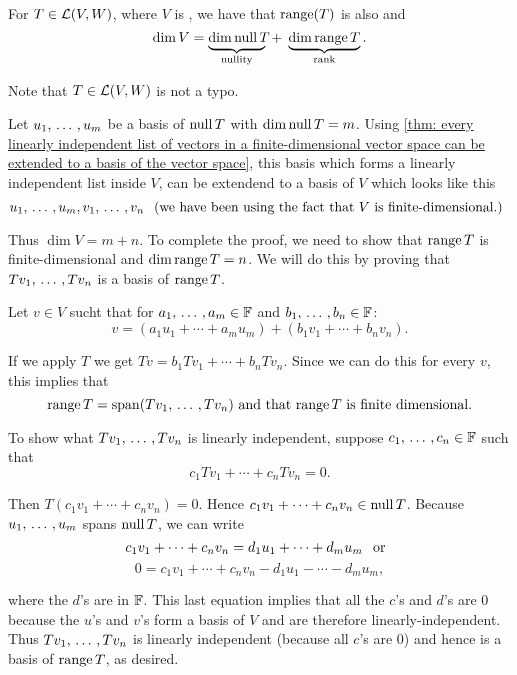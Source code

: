 \setcounter{thm}{20}
\begin{thm} 
  \label{rank-nullity-theorem}
  For $T \in \mathcal{L}(V,W)$, where $V$ is \fd, we have that $\operatorname{range}(T)$ is also \fd and
  \begin{equation}
    \dim V =
    \underbrace{ \dim\operatorname{null} T\phantom{g}\!\!\!\!\!}_{\text{nullity}}
    \; + \; \underbrace{\dim \operatorname{range} T}_{\text{rank}}.
  \end{equation}

  Note that $T \in \mathcal{L}(V,W)$ is not a typo.
\end{thm}
\begin{prf}
  Let $u_1, {\, \ldots \,\,}, u_m$ be a basis of $\operatorname{null} T$ with $\dim \operatorname{null} T = m$. Using \ref{thm: every linearly independent list of vectors in a finite-dimensional vector space can be extended to a basis of the vector space}, this basis which forms a linearly independent list inside $V$, can be extendend to a basis of $V$ which looks like this
  \[
    u_1, {\, \ldots \,\,}, u_m, v_1, {\, \ldots \,\,}, v_n \;\;\, \text{(we have been using the fact that $V$ is finite-dimensional.)}\;\;
  \]

  Thus $\dim V = m+n$. To complete the proof, we need to show that $\operatorname{range} T$ is finite-dimensional and $\dim \operatorname{range} T = n$. We will do this by proving that $Tv_1, {\, \ldots \,\,}, Tv_n$ is a basis of $\operatorname{range} T$.

  Let $v \in V$ sucht that for $a_1, {\, \ldots \,\,}, a_m \in \mathbb{F}$ and $b_1, {\, \ldots \,\,}, b_n \in \mathbb{F}$:
  \[
    v= (a_1 u_1 + \cdots + a_m  u_m) + (b_1 v_1 + \cdots + b_n v_n).
  \]

  If we apply $T$ we get $Tv=b_1Tv_1+ \cdots + b_nTv_n$. Since we can do this for every $v$, this implies that
  \[
    \myrange T = \myspan{Tv_1, \ddd, Tv_n} $ and that $\myrange T$ is finite dimensional.$
  \]

   To show what $Tv_1, {\, \ldots \,\,}, Tv_n$ is linearly independent, suppose $c_1, {\, \ldots \,\,}, c_n \in \mathbb{F}$ such that
  \[
    c_1 Tv_1 + \cdots + c_n T v_n = 0.
  \]

  Then $T(c_1 v_1 + \cdots + c_n v_n) = 0.$ Hence $c_1 v_1 + \cdots + c_n v_n \in \operatorname{null} T$. Because $u_1, {\, \ldots \,\,}, u_m$ spans $\operatorname{null} T$, we can write
  \[
    c_1 v_1 + \cdots + c_n v_n = d_1 u_1 + \cdots +  d_m u_m \;\;\, \text{or}\;\;
  \]
  \[
  0 = c_1 v_1 + \cdots + c_n v_n - d_1 u_1 - \cdots - d_m u_m,
  \]

  where the $d$'s are in $\mathbb{F}$. This last equation implies that all the $c$'s and $d$'s are $0$ because the $u$'s and $v$'s form a basis of $V$ and are therefore linearly-independent. Thus $Tv_1, {\, \ldots \,\,}, Tv_n$ is linearly independent (because all $c$'s are $0$) and hence is a basis of $\operatorname{range} T$, as desired.
\end{prf}


